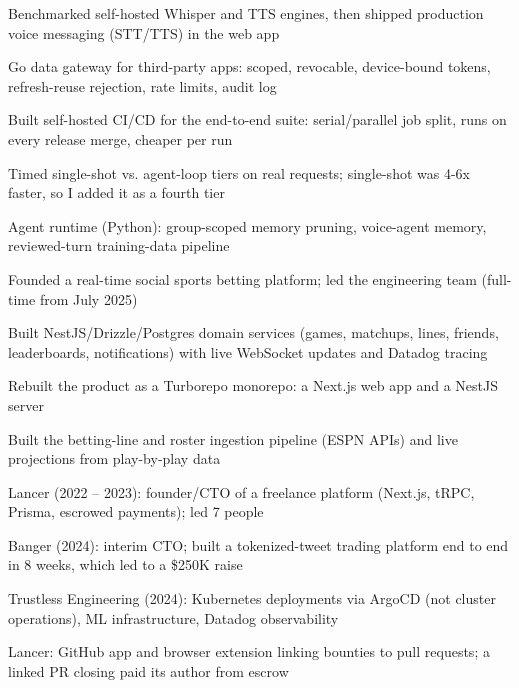 \documentclass[print]{jack-resume}
\begin{document}
\begin{tightemize}
    \item Benchmarked self-hosted Whisper and TTS engines, then shipped production voice messaging (STT/TTS) in the web app
    \item Go data gateway for third-party apps: scoped, revocable, device-bound tokens, refresh-reuse rejection, rate limits, audit log
    \item Built self-hosted CI/CD for the end-to-end suite: serial/parallel job split, runs on every release merge, cheaper per run
    \item Timed single-shot vs. agent-loop tiers on real requests; single-shot was 4-6x faster, so I added it as a fourth tier
    \item Agent runtime (Python): group-scoped memory pruning, voice-agent memory, reviewed-turn training-data pipeline
\end{tightemize}
\sectionsep

\begin{tightemize}
    \item Founded a real-time social sports betting platform; led the engineering team (full-time from July 2025)
    \item Built NestJS/Drizzle/Postgres domain services (games, matchups, lines, friends, leaderboards, notifications) with live WebSocket updates and Datadog tracing
    \item Rebuilt the product as a Turborepo monorepo: a Next.js web app and a NestJS server
    \item Built the betting-line and roster ingestion pipeline (ESPN APIs) and live projections from play-by-play data
\end{tightemize}
\sectionsep

\begin{tightemize}
    \item Lancer (2022 -- 2023): founder/CTO of a freelance platform (Next.js, tRPC, Prisma, escrowed payments); led 7 people
    \item Banger (2024): interim CTO; built a tokenized-tweet trading platform end to end in 8 weeks, which led to a \$250K raise
    \item Trustless Engineering (2024): Kubernetes deployments via ArgoCD (not cluster operations), ML infrastructure, Datadog observability
    \item Lancer: GitHub app and browser extension linking bounties to pull requests; a linked PR closing paid its author from escrow
\end{tightemize}
\sectionsep
\end{document}
